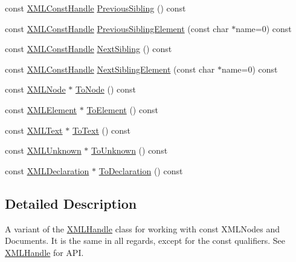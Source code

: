 \begin{DoxyCompactItemize}
\item 
const \hyperlink{classtinyxml2_1_1_x_m_l_const_handle}{X\+M\+L\+Const\+Handle} \hyperlink{classtinyxml2_1_1_x_m_l_const_handle_acf68cc7930e4ac883e0c7e16ef2fbb66}{Previous\+Sibling} () const
\item 
const \hyperlink{classtinyxml2_1_1_x_m_l_const_handle}{X\+M\+L\+Const\+Handle} \hyperlink{classtinyxml2_1_1_x_m_l_const_handle_aef99308659f2617299ac29980769a91e}{Previous\+Sibling\+Element} (const char $\ast$name=0) const
\item 
const \hyperlink{classtinyxml2_1_1_x_m_l_const_handle}{X\+M\+L\+Const\+Handle} \hyperlink{classtinyxml2_1_1_x_m_l_const_handle_aec3710e455f41014026ef17fbbb0efb3}{Next\+Sibling} () const
\item 
const \hyperlink{classtinyxml2_1_1_x_m_l_const_handle}{X\+M\+L\+Const\+Handle} \hyperlink{classtinyxml2_1_1_x_m_l_const_handle_a3c9e6b48b02d3d5232e1e8780753d8a5}{Next\+Sibling\+Element} (const char $\ast$name=0) const
\item 
const \hyperlink{classtinyxml2_1_1_x_m_l_node}{X\+M\+L\+Node} $\ast$ \hyperlink{classtinyxml2_1_1_x_m_l_const_handle_a61812760cb08bc1b050e65b73a08457b}{To\+Node} () const
\item 
const \hyperlink{classtinyxml2_1_1_x_m_l_element}{X\+M\+L\+Element} $\ast$ \hyperlink{classtinyxml2_1_1_x_m_l_const_handle_a4dba53c6e201d412e915620feaaa56f3}{To\+Element} () const
\item 
const \hyperlink{classtinyxml2_1_1_x_m_l_text}{X\+M\+L\+Text} $\ast$ \hyperlink{classtinyxml2_1_1_x_m_l_const_handle_a80e24d90d476005aa35602a665358e2d}{To\+Text} () const
\item 
const \hyperlink{classtinyxml2_1_1_x_m_l_unknown}{X\+M\+L\+Unknown} $\ast$ \hyperlink{classtinyxml2_1_1_x_m_l_const_handle_a4395e5feaba7b456a81ca274880ea3d3}{To\+Unknown} () const
\item 
const \hyperlink{classtinyxml2_1_1_x_m_l_declaration}{X\+M\+L\+Declaration} $\ast$ \hyperlink{classtinyxml2_1_1_x_m_l_const_handle_a55e306d105fa80d626041e4d3b77b716}{To\+Declaration} () const
\end{DoxyCompactItemize}


\subsection{Detailed Description}
A variant of the \hyperlink{classtinyxml2_1_1_x_m_l_handle}{X\+M\+L\+Handle} class for working with const X\+M\+L\+Nodes and Documents. It is the same in all regards, except for the \textquotesingle{}const\textquotesingle{} qualifiers. See \hyperlink{classtinyxml2_1_1_x_m_l_handle}{X\+M\+L\+Handle} for A\+PI. 

